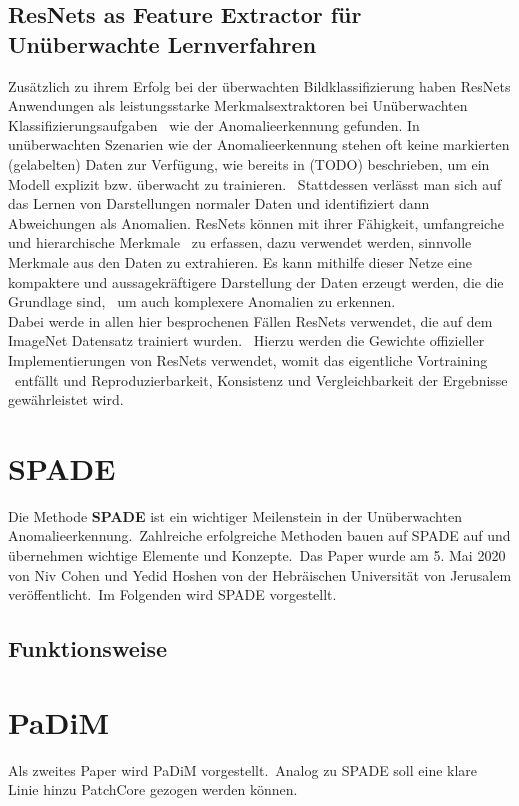 \subsection{ResNets as Feature Extractor für Unüberwachte Lernverfahren}\label{subsec:ResNetsAsFeatureExtractor}
Zusätzlich zu ihrem Erfolg bei der überwachten Bildklassifizierung haben ResNets Anwendungen als leistungsstarke Merkmalsextraktoren bei Unüberwachten Klassifizierungsaufgaben \ 
wie der Anomalieerkennung gefunden. In unüberwachten Szenarien wie der Anomalieerkennung stehen oft keine markierten (gelabelten) Daten zur Verfügung, wie bereits in (TODO) beschrieben, um ein Modell explizit bzw. überwacht zu trainieren. \ 
Stattdessen verlässt man sich auf das Lernen von Darstellungen normaler Daten und identifiziert dann Abweichungen als Anomalien. ResNets können mit ihrer Fähigkeit, umfangreiche und hierarchische Merkmale \ 
zu erfassen, dazu verwendet werden, sinnvolle Merkmale aus den Daten zu extrahieren. Es kann mithilfe dieser Netze eine kompaktere und aussagekräftigere Darstellung der Daten erzeugt werden, die die Grundlage sind, \
um auch komplexere Anomalien zu erkennen. \\
Dabei werde in allen hier besprochenen Fällen ResNets verwendet, die auf dem ImageNet Datensatz trainiert wurden. \
Hierzu werden die Gewichte offizieller Implementierungen von ResNets verwendet, womit das eigentliche Vortraining \ 
entfällt und Reproduzierbarkeit, Konsistenz und Vergleichbarkeit der Ergebnisse gewährleistet wird. \

\section{SPADE}\label{sec:SPADE}
Die Methode \textbf{SPADE} ist ein wichtiger Meilenstein in der Unüberwachten Anomalieerkennung.\
Zahlreiche erfolgreiche Methoden bauen auf SPADE auf und übernehmen wichtige Elemente und Konzepte.\
Das Paper wurde am 5. Mai 2020 von Niv Cohen und Yedid Hoshen von der Hebräischen Universität von Jerusalem veröffentlicht.\
Im Folgenden wird SPADE vorgestellt.\
\subsection{Funktionsweise  }
\section{PaDiM}\label{sec:PaDiM}
Als zweites Paper wird PaDiM vorgestellt.\
Analog zu SPADE soll eine klare Linie hinzu PatchCore gezogen werden können.\




